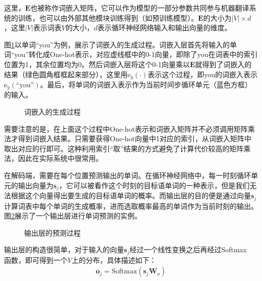 \noindent 这里，$\mathbf{E}$也被称作词嵌入矩阵，它可以作为模型的一部分参数共同参与机器翻译系统的训练，也可以由外部其他模块训练得到（如预训练模型）。$\mathbf{E}$的大小为$|V| \times d$，这里$|V|$表示词表$V$的大小，$d$表示循环神经网络输入和输出向量的维度。

\parinterval 图\ref{fig:6-12}以单词``you''为例，展示了词嵌入的生成过程。词嵌入层首先将输入的单词``you''转化成One-hot表示，对应虚线框中的0-1向量，即除了you在词表中的索引位置为1，其余位置均为0。然后词嵌入层将这个0-1向量乘以$\mathbf{E}$就得到了词嵌入的结果（绿色圆角框框起来部分），这里用$\textrm{e}_y (\cdot)$表示这个过程，即you的词嵌入表示$\textrm{e}_y (\textrm{``you''})$。最后，将单词的词嵌入表示作为当前时间步循环单元（蓝色方框）的输入。

\begin{figure}[htp]
\centering

\caption{词嵌入的生成过程}
\label{fig:6-12}
\end{figure}

\parinterval 需要注意的是，在上面这个过程中One-hot表示和词嵌入矩阵并不必须调用矩阵乘法才得到词嵌入结果。只需要获得One-hot向量中1对应的索引，从词嵌入矩阵中取出对应的行即可。这种利用索引``取''结果的方式避免了计算代价较高的矩阵乘法，因此在实际系统中很常用。

\parinterval 在解码端，需要在每个位置预测输出的单词。在循环神经网络中，每一时刻循环单元的输出向量为$\mathbf{s}_j$，它可以被看作这个时刻的目标语单词的一种表示，但是我们无法根据这个向量得出要生成的目标语单词的概率。而输出层的目的便是通过向量$\mathbf{s}_j$计算词表中每个单词的生成概率，进而选取概率最高的单词作为当前时刻的输出。图\ref{fig:6-13}展示了一个输出层进行单词预测的实例。

\begin{figure}[htp]
\centering

\caption{输出层的预测过程}
\label{fig:6-13}
\end{figure}

\parinterval 输出层的构造很简单，对于输入的向量$\mathbf{s}_j$经过一个线性变换之后再经过Softmax\\函数，即可得到一个$V$上的分布，具体描述如下：
\begin{eqnarray}
\mathbf{o}_j=\textrm{Softmax}( \mathbf{s}_j \mathbf{W}_o)
\label{eq:6-7}
\end{eqnarray}

